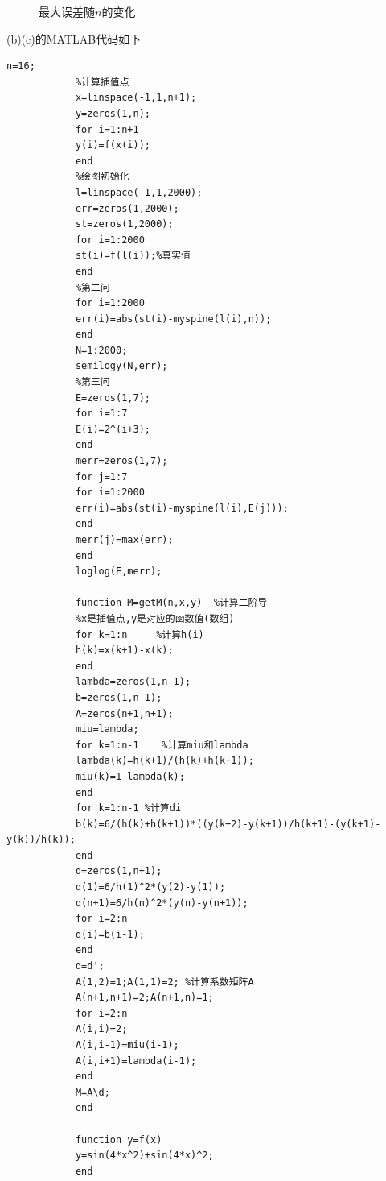 \documentclass[12pt,a4paper,utf8]{ctexart}
\begin{document}
\begin{enumerate}
\begin{figure}[H]
			\caption{最大误差随$n$的变化}  
			\label{4}  
		\end{figure} 
		(b)(c)的MATLAB代码如下
		\begin{lstlisting}[breaklines,frame=single]
			n=16;
			%计算插值点
			x=linspace(-1,1,n+1);
			y=zeros(1,n);
			for i=1:n+1
			y(i)=f(x(i));
			end
			%绘图初始化
			l=linspace(-1,1,2000);
			err=zeros(1,2000);
			st=zeros(1,2000);
			for i=1:2000
			st(i)=f(l(i));%真实值
			end
			%第二问
			for i=1:2000
			err(i)=abs(st(i)-myspine(l(i),n));
			end
			N=1:2000;
			semilogy(N,err);
			%第三问
			E=zeros(1,7);
			for i=1:7
			E(i)=2^(i+3);
			end
			merr=zeros(1,7);
			for j=1:7
			for i=1:2000
			err(i)=abs(st(i)-myspine(l(i),E(j)));
			end
			merr(j)=max(err);
			end
			loglog(E,merr);
			
			function M=getM(n,x,y)  %计算二阶导
			%x是插值点,y是对应的函数值(数组)
			for k=1:n     %计算h(i)
			h(k)=x(k+1)-x(k);
			end
			lambda=zeros(1,n-1);
			b=zeros(1,n-1);
			A=zeros(n+1,n+1);
			miu=lambda;
			for k=1:n-1    %计算miu和lambda
			lambda(k)=h(k+1)/(h(k)+h(k+1));
			miu(k)=1-lambda(k);
			end
			for k=1:n-1 %计算di
			b(k)=6/(h(k)+h(k+1))*((y(k+2)-y(k+1))/h(k+1)-(y(k+1)-y(k))/h(k));
			end
			d=zeros(1,n+1);
			d(1)=6/h(1)^2*(y(2)-y(1));
			d(n+1)=6/h(n)^2*(y(n)-y(n+1));
			for i=2:n
			d(i)=b(i-1);
			end
			d=d';
			A(1,2)=1;A(1,1)=2; %计算系数矩阵A
			A(n+1,n+1)=2;A(n+1,n)=1;
			for i=2:n
			A(i,i)=2;
			A(i,i-1)=miu(i-1);
			A(i,i+1)=lambda(i-1);
			end
			M=A\d;
			end
			
			function y=f(x)
			y=sin(4*x^2)+sin(4*x)^2;
			end
			

\end{lstlisting}
\end{enumerate}
\end{document}
